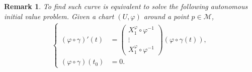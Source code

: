 \documentclass[8pt]{article}
\newtheorem{remark}{Remark}[section]
\newcommand{\M}[0]{\mathcal{M}}
\begin{document}
\begin{remark}
  To find such curve is equivalent to solve the following autonomous initial value problem. Given a chart $(U,\varphi)$ around a point $p\in\M$, 
  \begin{align*}
    \begin{cases}
      (\varphi\circ\gamma)'(t) &= \begin{pmatrix}
      X_1^\varphi\circ\varphi^{-1}\\
      \vdots\\
      X_1^\varphi\circ\varphi^{-1}
    \end{pmatrix}
    (\varphi\circ \gamma(t)),\\
    (\varphi\circ\gamma)(t_0) &= 0.
    \end{cases}
  \end{align*}
\end{remark}
\end{document}
